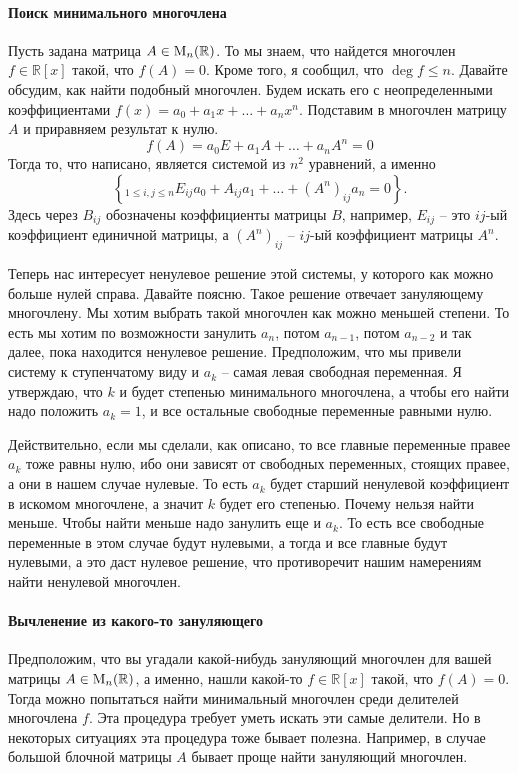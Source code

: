 \paragraph{Поиск минимального многочлена}

Пусть задана матрица $A\in \operatorname{M}_{n}(\mathbb R)$.
То мы знаем, что найдется многочлен $f\in\mathbb R[x]$ такой, что $f(A) = 0$.
Кроме того, я сообщил, что $\deg f\leqslant n$.
Давайте обсудим, как найти подобный многочлен.
Будем искать его с неопределенными коэффициентами $f(x) = a_0 + a_1 x + \ldots + a_n x^n$.
Подставим в многочлен матрицу $A$ и приравняем результат к нулю.
\[
f(A) = a_0 E + a_1 A + \ldots + a_n A^n = 0
\]
Тогда то, что написано, является системой из $n^2$ уравнений, а именно
\[
\left\{_{1\leqslant i,j\leqslant n}
E_{ij}a_0 + A_{ij}a_1 + \ldots + (A^n)_{ij}a_n = 0
\right\}.
\]
Здесь через $B_{ij}$ обозначены коэффициенты матрицы $B$, например, $E_{ij}$ -- это $ij$-ый коэффициент единичной матрицы, а $(A^n)_{ij}$ -- $ij$-ый коэффициент матрицы $A^n$.

Теперь нас интересует ненулевое решение этой системы, у которого как можно больше нулей справа.
Давайте поясню.
Такое решение отвечает зануляющему многочлену.
Мы хотим выбрать такой многочлен как можно меньшей степени.
То есть мы хотим по возможности занулить $a_n$, потом $a_{n-1}$, потом $a_{n-2}$ и так далее, пока находится ненулевое решение.
Предположим, что мы привели систему к ступенчатому виду и $a_k$ -- самая левая свободная переменная.
Я утверждаю, что $k$ и будет степенью минимального многочлена, а чтобы его найти надо положить $a_k = 1$, и все остальные свободные переменные равными нулю.

Действительно, если мы сделали, как описано, то все главные переменные правее $a_k$ тоже равны нулю, ибо они зависят от свободных переменных, стоящих правее, а они в нашем случае нулевые.
То есть $a_k$ будет старший ненулевой коэффициент в искомом многочлене, а значит $k$ будет его степенью.
Почему нельзя найти меньше.
Чтобы найти меньше надо занулить еще и $a_k$.
То есть все свободные переменные в этом случае будут нулевыми, а тогда и все главные будут нулевыми, а это даст нулевое решение, что противоречит нашим намерениям найти ненулевой многочлен.

\paragraph{Вычленение из какого-то зануляющего}

Предположим, что вы угадали какой-нибудь зануляющий многочлен для вашей матрицы $A\in\operatorname{M}_{n}(\mathbb R)$, а именно, нашли какой-то $f\in \mathbb R[x]$ такой, что $f(A) = 0$.
Тогда можно попытаться найти минимальный многочлен среди делителей многочлена $f$.
Эта процедура требует уметь искать эти самые делители.
Но в некоторых ситуациях эта процедура тоже бывает полезна.
Например, в случае большой блочной матрицы $A$ бывает проще найти зануляющий многочлен.

